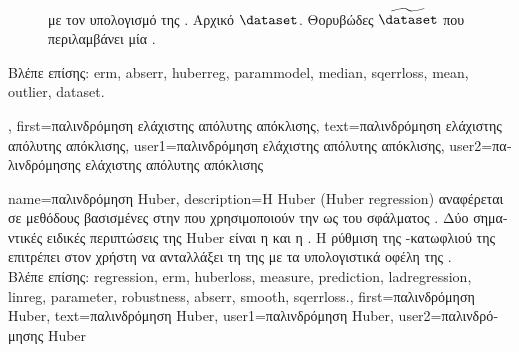 {{\begin{figure}[H]
{{{			με τον υπολογισμό της} . 
			 \foreignlanguage{greek}{Αρχικό}  $\dataset$.  
			\foreignlanguage{greek}{Θορυβώδες}  $\widetilde{\dataset}$ \foreignlanguage{greek}{που 
			περιλαμβάνει μία} . \label{fig_lad_dict}} }
		\end{figure}
		\foreignlanguage{greek}{Βλέπε επίσης:} \gls{erm}, \gls{abserr}, \gls{huberreg}, \gls{parammodel}, \gls{median}, \gls{sqerrloss}, 
		\gls{mean}, \gls{outlier}, \gls{dataset}.},
	first={\foreignlanguage{greek}{παλινδρόμηση ελάχιστης απόλυτης απόκλισης}},
	text={\foreignlanguage{greek}{παλινδρόμηση ελάχιστης απόλυτης απόκλισης}},
	user1={\foreignlanguage{greek}{παλινδρόμηση ελάχιστης απόλυτης απόκλισης}}, %
	user2={\foreignlanguage{greek}{παλινδρόμησης ελάχιστης απόλυτης απόκλισης}} %
}

{name={\foreignlanguage{greek}{παλινδρόμηση} Huber},
	description={\foreignlanguage{greek}{Η}  Huber 
		(Huber regression) \cite{huber1992robust} \foreignlanguage{greek}{αναφέρεται σε μεθόδους βασισμένες στην}  
		\foreignlanguage{greek}{που χρησιμοποιούν την}  \foreignlanguage{greek}{ως}  
		\foreignlanguage{greek}{του σφάλματος} . \foreignlanguage{greek}{Δύο σημαντικές ειδικές περιπτώσεις της} 
		 Huber \foreignlanguage{greek}{είναι η}  \foreignlanguage{greek}{και η} 
		. \foreignlanguage{greek}{Η ρύθμιση της} -\foreignlanguage{greek}{κατωφλιού 
		της}  \foreignlanguage{greek}{επιτρέπει στον χρήστη να ανταλλάξει τη}  
		\foreignlanguage{greek}{της}  \foreignlanguage{greek}{με τα υπολογιστικά οφέλη της}  
		.
		\\
		\foreignlanguage{greek}{Βλέπε επίσης:} \gls{regression}, \gls{erm}, \gls{huberloss}, \gls{measure}, \gls{prediction}, \gls{ladregression}, 
		\gls{linreg}, \gls{parameter}, \gls{robustness}, \gls{abserr}, \gls{smooth}, \gls{sqerrloss}.},
	first={\foreignlanguage{greek}{παλινδρόμηση} Huber},
	text={\foreignlanguage{greek}{παλινδρόμηση} Huber},
	user1={\foreignlanguage{greek}{παλινδρόμηση} Huber}, %
	user2={\foreignlanguage{greek}{παλινδρόμησης} Huber} %
}

